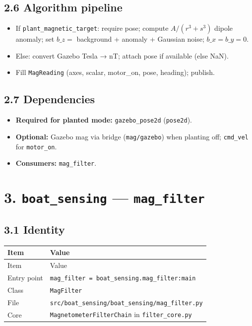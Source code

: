 \subsection{2.6 Algorithm pipeline}


\begin{itemize}[leftmargin=*]
\item If \texttt{plant\_magnetic\_target}: require pose; compute \(A/(r^3+s^3)\) dipole anomaly; set \(b\_z =\) background + anomaly + Gaussian noise; \(b\_x=b\_y=0\).
\item Else: convert Gazebo Tesla → nT; attach pose if available (else NaN).
\item Fill \texttt{MagReading} (axes, scalar, motor\_on, pose, heading); publish.
\end{itemize}


\subsection{2.7 Dependencies}


\begin{itemize}[leftmargin=*]
\item \textbf{Required for planted mode:} \texttt{gazebo\_pose2d} (\texttt{pose2d}).
\item \textbf{Optional:} Gazebo mag via bridge (\texttt{mag/gazebo}) when planting off; \texttt{cmd\_vel} for \texttt{motor\_on}.
\item \textbf{Consumers:} \texttt{mag\_filter}.
\end{itemize}




\section{3. \texttt{boat\_sensing} --- \texttt{mag\_filter}}


\subsection{3.1 Identity}


\begin{center}
\small
\begin{longtable}{@{}lp{10cm}@{}}
\toprule
Item & Value \\
\midrule
\endfirsthead
\toprule
Item & Value \\
\midrule
\endhead
Entry point & \texttt{mag\_filter = boat\_sensing.mag\_filter:main} \\
Class & \texttt{MagFilter} \\
File & \texttt{src/boat\_sensing/boat\_sensing/mag\_filter.py} \\
Core & \texttt{MagnetometerFilterChain} in \texttt{filter\_core.py} \\
\bottomrule
\end{longtable}
\end{center}


